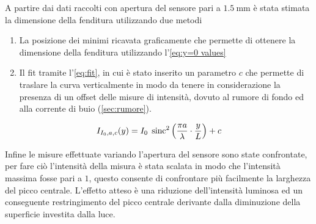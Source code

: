 \documentclass[../main.tex]{subfiles}
\begin{document}
A partire dai dati raccolti con apertura del sensore pari a $\qty{1.5}{\mm}$
è stata stimata la dimensione della fenditura utilizzando due metodi

\begin{enumerate}
    \item La posizione dei minimi ricavata graficamente che permette di ottenere la dimensione della fenditura utilizzando l'\autoref{eq:y=0 values}
    \item Il fit tramite l'\autoref{eq:fit}, in cui è stato inserito un parametro $c$ che permette di traslare la curva verticalmente in modo da tenere in considerazione la presenza di un offset delle misure di intensità, dovuto al rumore di fondo ed alla corrente di buio (\autoref{sec:rumore}).
\end{enumerate}

\begin{equation} \label{eq:fit}
    I_{I_{0}, a, c}(y) = I_{0} \; \operatorname{sinc}^{2} \left( \frac{\pi a}{\lambda} \cdot \frac{y}{L} \right) + c
\end{equation}

Infine le misure effettuate variando l'apertura del sensore sono state confrontate, per fare ciò l'intensità della misura è stata scalata in modo che l'intensità massima fosse pari a $1$, questo consente di confrontare più facilmente la larghezza del picco centrale. L'effetto atteso è una riduzione dell'intensità luminosa ed un conseguente restringimento del picco centrale derivante dalla diminuzione della superficie investita dalla luce.
\end{document}
